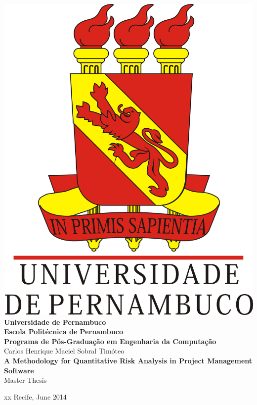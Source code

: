 \begin{titlepage}

  \begin{center}
  \includegraphics[scale=0.17]{image/UPE_brasao}\\
	\textbf{Universidade de Pernambuco}\\
	\textbf{Escola Politécnica de Pernambuco}\\
    \textbf{Programa de Pós-Graduação em Engenharia da Computação}\\[3cm]

    Carlos Henrique Maciel Sobral Timóteo\\[2cm]


    {\large \textbf{A Methodology for Quantitative Risk Analysis in Project Management Software}}\\[3cm]

    Master Thesis\\[2cm]
  \end{center}


\begin{center}
  {\color{white} xx}\vfill
  Recife, June 2014
\end{center}

\end{titlepage}
